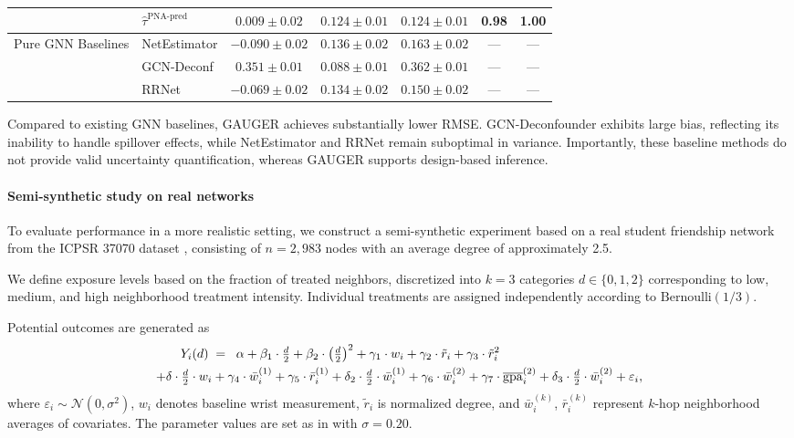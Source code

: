 \documentclass{article}
\theoremstyle{plain}
\theoremstyle{definition}
\theoremstyle{remark}
\begin{document}
\begin{table}[htbp]
\begin{tabular}{ll|ccc|cc}
& $\hat{\tau}^{\text{PNA-pred}}$ 
& $\mathbf{0.009 \pm 0.02}$ & $\mathbf{0.124 \pm 0.01}$ & $\mathbf{0.124 \pm 0.01}$ & 0.98 & 1.00 \\
\midrule
\multirow{3}{*}{Pure GNN Baselines}
& NetEstimator 
& $-0.090 \pm 0.02$ & $0.136 \pm 0.02$ & $0.163 \pm 0.02$ & --- & --- \\
& GCN-Deconf 
& $0.351 \pm 0.01$ & $0.088 \pm 0.01$ & $0.362 \pm 0.01$ & --- & --- \\
& RRNet 
& $-0.069 \pm 0.02$ & $0.134 \pm 0.02$ & $0.150 \pm 0.02$ & --- & --- \\
\bottomrule
\end{tabular}
\label{tab:synthetic_full}
\end{table}
Compared to existing GNN baselines, GAUGER achieves substantially lower RMSE. GCN-Deconfounder exhibits large bias, reflecting its inability to handle spillover effects, while NetEstimator and RRNet remain suboptimal in variance. Importantly, these baseline methods do not provide valid uncertainty quantification, whereas GAUGER supports design-based inference.


\paragraph{Semi-synthetic study on real networks}

To evaluate performance in a more realistic setting, we construct a semi-synthetic experiment based on a real student friendship network from the ICPSR 37070 dataset \citep{aronow2017estimating}, consisting of $n = 2{,}983$ nodes with an average degree of approximately 2.5. 

We define exposure levels based on the fraction of treated neighbors, discretized into $k = 3$ categories $d \in \{0,1,2\}$ corresponding to low, medium, and high neighborhood treatment intensity. Individual treatments are assigned independently according to $\mathrm{Bernoulli}(1/3)$.

Potential outcomes are generated as
\begin{align}
  Y_i(d) \;&=\;
    \;\alpha
     + \beta_1 \cdot \tfrac{d}{2}
     + \beta_2 \cdot \bigl(\tfrac{d}{2}\bigr)^2 \notag 
    + \gamma_1 \cdot w_i
     + \gamma_2 \cdot \tilde{r}_i
     + \gamma_3 \cdot \tilde{r}_i^2 \notag \\
    + \delta \cdot \tfrac{d}{2} \cdot w_i & + \gamma_4 \cdot \bar{w}_i^{(1)}
     + \gamma_5 \cdot \bar{r}_i^{(1)}
     + \delta_2 \cdot \tfrac{d}{2} \cdot \bar{w}_i^{(1)} + \gamma_6 \cdot \bar{w}_i^{(2)}
     + \gamma_7 \cdot \overline{\mathrm{gpa}}_i^{(2)}
     + \delta_3 \cdot \tfrac{d}{2} \cdot \bar{w}_i^{(2)}
     + \varepsilon_i,
\end{align}
where $\varepsilon_i \sim \mathcal{N}(0, \sigma^2)$, $w_i$ denotes baseline wrist measurement, $\tilde{r}_i$ is normalized degree, and $\bar{w}_i^{(k)}$, $\bar{r}_i^{(k)}$ represent $k$-hop neighborhood averages of covariates. The parameter values are set as in with $\sigma = 0.20$.
\end{document}

